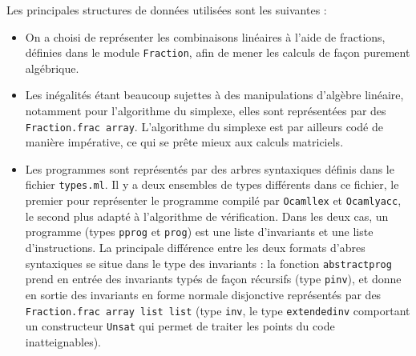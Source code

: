 \documentclass[a4paper]{article}
\begin{document}
Les principales structures de données utilisées sont les suivantes :

\begin{itemize}
  \item On a choisi de représenter les combinaisons linéaires à l'aide de fractions, définies dans le module \texttt{Fraction}, afin de mener les calculs de façon purement algébrique.
  \item Les inégalités étant beaucoup sujettes à des manipulations d'algèbre linéaire, notamment pour l'algorithme du simplexe, elles sont représentées par des \texttt{Fraction.frac array}. L'algorithme du simplexe est par ailleurs codé de manière impérative, ce qui se prête mieux aux calculs matriciels.
  \item Les programmes sont représentés par des arbres syntaxiques définis dans le fichier \texttt{types.ml}. Il y a deux ensembles de types différents dans ce fichier, le premier pour représenter le programme compilé par \texttt{Ocamllex} et \texttt{Ocamlyacc}, le second plus adapté à l'algorithme de vérification. Dans les deux cas, un programme (types \texttt{pprog} et \texttt{prog}) est une liste d'invariants et une liste d'instructions. La principale différence entre les deux formats d'abres syntaxiques se situe dans le type des invariants : la fonction \texttt{abstract\textunderscore prog} prend en entrée des invariants typés de façon récursifs (type \texttt{pinv}), et donne en sortie des invariants en forme normale disjonctive représentés par des \texttt{Fraction.frac array list list} (type \texttt{inv}, le type \texttt{extended\textunderscore inv} comportant un constructeur \texttt{Unsat} qui permet de traiter les points du code inatteignables).
\end{itemize}
\end{document}
